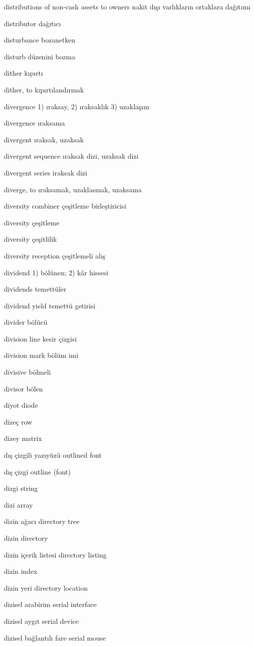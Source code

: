 \documentclass[12pt,fleqn]{article}\usepackage{../../common}
\begin{document}
distributions of non-cash assets to owners nakit dışı varlıkların ortaklara dağıtımı

distributor dağıtıcı

disturbance bozanetken

disturb düzenini bozma

dither kıpırtı

dither, to kıpırtılandırmak

divergence 1) ıraksay, 2) ıraksaklık 3) uzaklaşım

divergence ıraksama

divergent ıraksak, uzaksak

divergent sequence ıraksak dizi, uzaksak dizi

divergent series iraksak dizi

diverge, to ıraksamak, uzaklasmak, uzaksama

diversity combiner çeşitleme birleştiricisi

diversity çeşitleme

diversity çeşitlilik

diversity reception çeşitlemeli alış

dividend 1) bölünen; 2) kâr hissesi

dividends temettüler

dividend yield temettü getirisi

divider bölücü

division line kesir çizgisi

division mark bölüm imi

divisive bölmeli

divisor bölen

diyot diode

dizeç row

dizey matrix

dış çizgili yazıyüzü outlined font

dış çizgi outline (font)

dizgi string

dizi array

dizin ağacı directory tree

dizin directory

dizin içerik listesi directory listing

dizin index

dizin yeri directory location

dizisel arabirim serial interface

dizisel aygıt serial device

dizisel bağlantılı fare serial mouse
\end{document}
